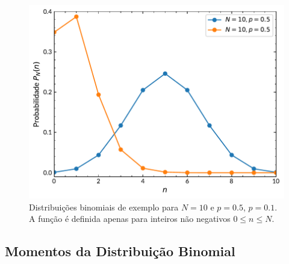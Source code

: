\begin{figure}
	\centering
	\includegraphics[width=0.7\linewidth]{Figuras/3-1.pdf}
	\caption{Distribuições binomiais de exemplo para $N = 10$ e $p = 0.5$, $p = 0.1$. A função é definida apenas para inteiros não negativos $0 \leq n \leq N$.}
	\label{fig:3-1}
\end{figure}

\subsection{Momentos da Distribuição Binomial}

